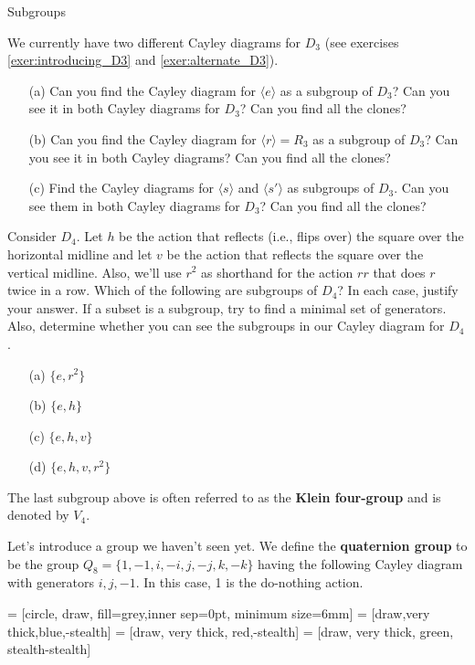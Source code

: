 \begin{section}{Subgroups}
\begin{exercise}
We currently have two different Cayley diagrams for $D_3$ (see exercises \ref{exer:introducing_D3} and \ref{exer:alternate_D3}).  
\begin{enumerate}
\item[(a)] Can you find the Cayley diagram for $\langle e\rangle$ as a subgroup of $D_3$?  Can you see it in both Cayley diagrams for $D_3$?  Can you find all the clones?
\item[(b)] Can you find the Cayley diagram for $\langle r\rangle =R_3$ as a subgroup of $D_3$?  Can you see it in both Cayley diagrams?  Can you find all the clones?
\item[(c)] Find the Cayley diagrams for $\langle s\rangle$ and $\langle s'\rangle$ as subgroups of $D_3$.  Can you see them in both Cayley diagrams for $D_3$?  Can you find all the clones?
\end{enumerate}
\end{exercise}

\begin{exercise}\label{exer:subgroups_D4}
Consider $D_4$.  Let $h$ be the action that reflects (i.e., flips over) the square over the horizontal midline and let $v$ be the action that reflects the square over the vertical midline.  Also, we'll use $r^2$ as shorthand for the action $rr$ that does $r$ twice in a row.  Which of the following are subgroups of $D_4$?  In each case, justify your answer.  If a subset is a subgroup, try to find a minimal set of generators.  Also, determine whether you can see the subgroups in our Cayley diagram for $D_4$.
\begin{enumerate}
\item[(a)] $\{e, r^2\}$
\item[(b)] $\{e,h\}$
\item[(c)] $\{e, h, v\}$
\item[(d)] $\{e, h, v, r^2\}$
\end{enumerate}
\end{exercise}

The last subgroup above is often referred to as the \textbf{Klein four-group} and is denoted by $V_4$.

Let's introduce a group we haven't seen yet.  We define the \textbf{quaternion group} to be the group $Q_8=\{1,-1,i,-i,j,-j,k,-k\}$ having the following Cayley diagram with generators $i, j, -1$.  In this case, 1 is the do-nothing action.

 = [circle, draw, fill=grey,inner sep=0pt, minimum size=6mm]
 = [draw,very thick,blue,-stealth]
 = [draw, very thick, red,-stealth]
 = [draw, very thick, green, stealth-stealth]


\end{section}
